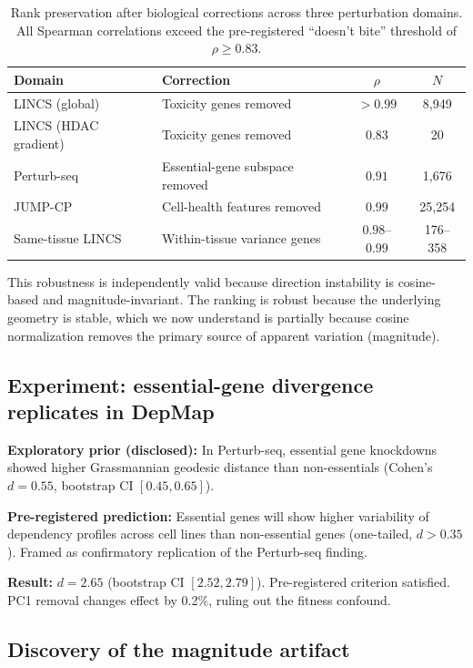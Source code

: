 \documentclass[11pt]{article}
\begin{document}
\begin{table}[h]
\centering
\caption{Rank preservation after biological corrections across three
perturbation domains. All Spearman correlations exceed the pre-registered
``doesn't bite'' threshold of $\rho \geq 0.83$.}
\label{tab:robustness}
\begin{tabular}{llcc}
\toprule
Domain & Correction & $\rho$ & $N$ \\
\midrule
LINCS (global) & Toxicity genes removed & $>0.99$ & 8{,}949 \\
LINCS (HDAC gradient) & Toxicity genes removed & $0.83$ & 20 \\
Perturb-seq & Essential-gene subspace removed & $0.91$ & 1{,}676 \\
JUMP-CP & Cell-health features removed & $0.99$ & 25{,}254 \\
\midrule
Same-tissue LINCS & Within-tissue variance genes & $0.98$--$0.99$ & 176--358 \\
\bottomrule
\end{tabular}
\end{table}

This robustness is independently valid because direction instability is
cosine-based and magnitude-invariant. The ranking is robust because the
underlying geometry is stable, which we now understand is partially
because cosine normalization removes the primary source of apparent
variation (magnitude).

\subsection{Experiment: essential-gene divergence replicates in DepMap}

\textbf{Exploratory prior (disclosed):} In Perturb-seq, essential gene
knockdowns showed higher Grassmannian geodesic distance than non-essentials
(Cohen's $d = 0.55$, bootstrap CI $[0.45, 0.65]$).

\textbf{Pre-registered prediction:} Essential genes will show higher
variability of dependency profiles across cell lines than non-essential
genes (one-tailed, $d > 0.35$). Framed as confirmatory replication of
the Perturb-seq finding.

\textbf{Result:} $d = 2.65$ (bootstrap CI $[2.52, 2.79]$).
Pre-registered criterion satisfied. PC1 removal changes effect by
0.2\%, ruling out the fitness confound.

\subsection{Discovery of the magnitude artifact}
\label{sec:artifact}
\end{document}
